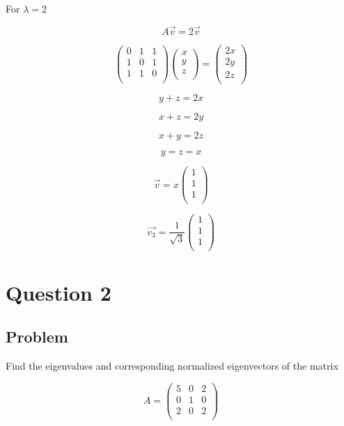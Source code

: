 \documentclass[12pt]{article}
\begin{document}
For \(\lambda = 2\)

\[
    A\vec{v} = 2\vec{v}
\]

\[
    \begin{pmatrix}
        0 & 1 & 1 \\
        1 & 0 & 1 \\
        1 & 1 & 0 \\
    \end{pmatrix} \begin{pmatrix}
        x \\
        y \\
        z \\
    \end{pmatrix} = \begin{pmatrix}
        2x \\
        2y \\
        2z \\
    \end{pmatrix}
\]

\[
    y + z = 2x
\]

\[
    x + z = 2y
\]

\[
    x + y = 2z
\]

\[
    y = z = x
\]

\[
    \vec{v} = x \begin{pmatrix}
        1 \\
        1 \\
        1 \\
    \end{pmatrix}
\]

\[
    \vec{v_3} = \frac{1}{\sqrt{3}} \begin{pmatrix}
        1 \\
        1 \\
        1 \\
    \end{pmatrix}
\]

\newpage
\section{Question 2}

\subsection{Problem}

Find the eigenvalues and corresponding normalized eigenvectors of the matrix

\[
    A = \begin{pmatrix}
        5 & 0 & 2 \\
        0 & 1 & 0 \\
        2 & 0 & 2 \\
    \end{pmatrix}
\]
\end{document}
